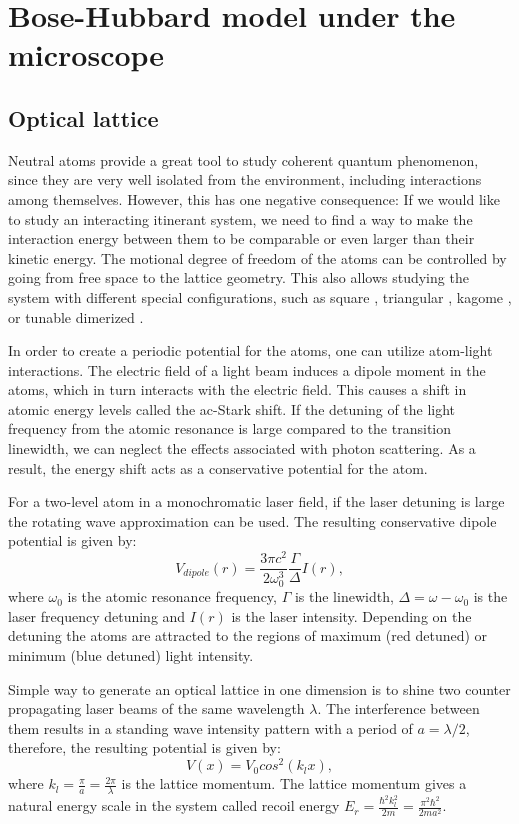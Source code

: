 
\chapter{Bose-Hubbard model under the microscope}

\section{Optical lattice}
Neutral atoms provide a great tool to study coherent quantum phenomenon, since they are very well isolated from the environment, including interactions among themselves. However, this has one negative consequence: If we would like to study an interacting itinerant system, we need to find a way to make the interaction energy between them to be comparable or even larger than their kinetic energy. The motional degree of freedom of the atoms can be controlled by going from free space to the lattice geometry. This also allows studying the system with different special configurations, such as square \cite{Greiner2002}, triangular \cite{Becker2010}, kagome \cite{Jo2012}, or tunable dimerized \cite{Greif2013}.

In order to create a periodic potential for the atoms, one can utilize atom-light interactions. The electric field of a light beam induces a dipole moment in the atoms, which in turn interacts with the electric field. This causes a shift in atomic energy levels called the ac-Stark shift. If the detuning of the light frequency from the atomic resonance is large compared to the transition linewidth, we can neglect the effects associated with photon scattering. As a result, the energy shift acts as a conservative potential for the atom.

For a two-level atom in a monochromatic laser field, if the laser detuning is large the rotating wave approximation can be used. The resulting conservative dipole potential is given by:
\begin{equation}
V_{dipole}(r) = \frac{3\pi c^2}{2\omega_0^3} \frac{\Gamma}{\Delta} I(r),
\end{equation}
where $\omega_0$ is the atomic resonance frequency, $\Gamma$ is the linewidth, $\Delta = \omega-\omega_0$ is the laser frequency detuning and $I(r)$ is the laser intensity. Depending on the detuning the atoms are attracted to the regions of maximum (red detuned) or minimum (blue detuned) light intensity. 

Simple way to generate an optical lattice in one dimension is to shine two counter propagating laser beams of the same wavelength $\lambda$. The interference between them results in a standing wave intensity pattern with a period of $a=\lambda/2$, therefore, the resulting potential is given by:
\begin{equation}
V(x) = V_0cos^2(k_l x),
\end{equation}
where $k_l = \frac{\pi}{a} =\frac{2\pi}{\lambda}$ is the lattice momentum. The lattice momentum gives a natural energy scale in the system called recoil energy $E_r = \frac{\hbar^2 k_l^2}{2m} = \frac{\pi^2 \hbar^2}{2 m a^2}$.

